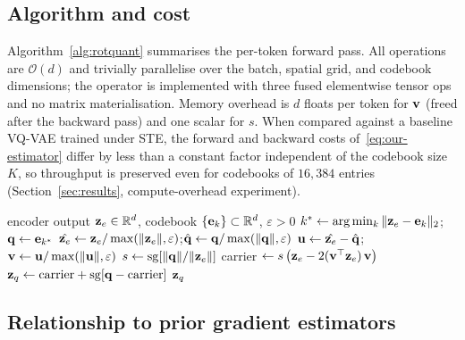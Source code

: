 \subsection{Algorithm and cost}

Algorithm~\ref{alg:rotquant} summarises the per-token forward pass.
All operations are $\mathcal{O}(d)$ and trivially parallelise over
the batch, spatial grid, and codebook dimensions; the operator is
implemented with three fused elementwise tensor ops and no matrix
materialisation. Memory overhead is $d$ floats per token for
$\mathbf{v}$ (freed after the backward pass) and one scalar for $s$. When
compared against a baseline VQ-VAE trained under STE, the forward
and backward costs of~\eqref{eq:our-estimator} differ by less than a
constant factor independent of the codebook size $K$, so throughput
is preserved even for codebooks of $16{,}384$ entries
(Section~\ref{sec:results}, compute-overhead experiment).

\begin{algorithm}[t]
\caption{\ours{} forward pass (per latent token).}
\label{alg:rotquant}
\begin{algorithmic}[1]
  \Require encoder output $\mathbf{z}_e \in \mathbb{R}^{d}$, codebook $\{\mathbf{e}_k\} \subset \mathbb{R}^{d}$, $\varepsilon > 0$
  \State $k^* \gets \arg\min_k \|\mathbf{z}_e - \mathbf{e}_k\|_2$;\quad $\mathbf{q} \gets \mathbf{e}_{k^*}$
  \State $\hat{\mathbf{z}_e} \gets \mathbf{z}_e/\max(\|\mathbf{z}_e\|,\varepsilon)$;\quad $\hat{\mathbf{q}} \gets \mathbf{q}/\max(\|\mathbf{q}\|,\varepsilon)$
  \State $\mathbf{u} \gets \hat{\mathbf{z}_e} - \hat{\mathbf{q}}$;\quad $\mathbf{v} \gets \mathbf{u}/\max(\|\mathbf{u}\|,\varepsilon)$
  \State $s \gets \operatorname{sg}\!\left[\|\mathbf{q}\|/\|\mathbf{z}_e\|\right]$
  \State carrier $\gets s\,\big(\mathbf{z}_e - 2(\mathbf{v}^\top \mathbf{z}_e)\,\mathbf{v}\big)$ 
  \State $\mathbf{z}_q \gets \text{carrier} + \operatorname{sg}\!\left[\mathbf{q} - \text{carrier}\right]$ 
  \State \Return $\mathbf{z}_q$
\end{algorithmic}
\end{algorithm}

\subsection{Relationship to prior gradient estimators}

